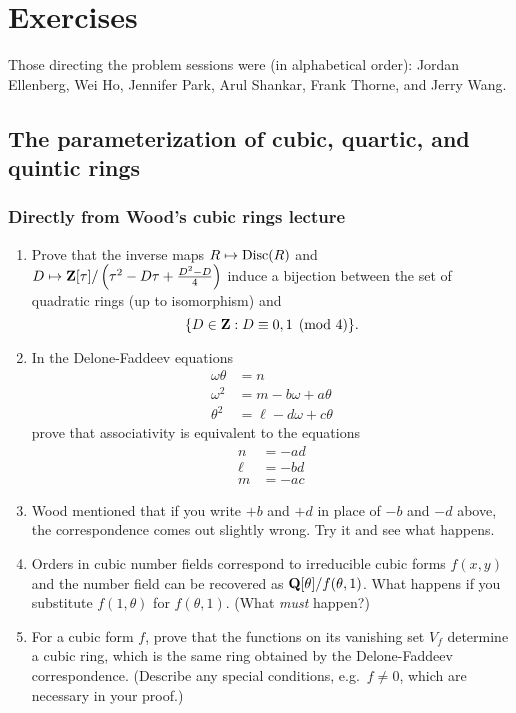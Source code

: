 
\section{Exercises}





Those directing the problem sessions were (in alphabetical order): 
Jordan Ellenberg, Wei Ho, Jennifer Park, Arul Shankar, Frank Thorne, and 
Jerry Wang. 





\subsection{The parameterization of cubic, quartic, and quintic rings}


\subsubsection{Directly from Wood's cubic rings lecture}
\begin{enumerate}[\indent a)]
  \item Prove that the inverse maps $R\mapsto \operatorname{Disc}(R)$ and 
    $D\mapsto \mathbf{Z}[\tau]/\left(\tau^2-D\tau+\frac{D^2-D}{4}\right)$ induce a 
    bijection between the set of quadratic rings (up to isomorphism) and 
    \[
      \{D\in \mathbf{Z}:D\equiv 0,1\pmod 4\} . 
    \]
  \item In the Delone-Faddeev equations 
    \begin{align*}
      \omega\theta &= n \\
      \omega^2 &= m-b\omega + a\theta \\
      \theta^2 &= \ell-d\omega + c\theta 
    \end{align*}
    prove that associativity is equivalent to the equations 
    \begin{align*}
      n &= -a d \\
      \ell &= -b d \\
      m &= - a c
    \end{align*}
  \item Wood mentioned that if you write $+b$ and $+d$ in place of $-b$ and 
    $-d$ above, the correspondence comes out slightly wrong. Try it and see 
    what happens. 
  \item Orders in cubic number fields correspond to irreducible cubic forms 
    $f(x,y)$ and the number field can be recovered as 
    $\mathbf{Q}[\theta]/f(\theta,1)$. What happens if you substitute $f(1,\theta)$ for 
    $f(\theta,1)$. (What \emph{must} happen?)
  \item For a cubic form $f$, prove that the functions on its vanishing set 
    $V_f$ determine a cubic ring, which is the same ring obtained by the 
    Delone-Faddeev correspondence. (Describe any special conditions, 
    e.g.~$f\ne 0$, which are necessary in your proof.) 
\end{enumerate}


